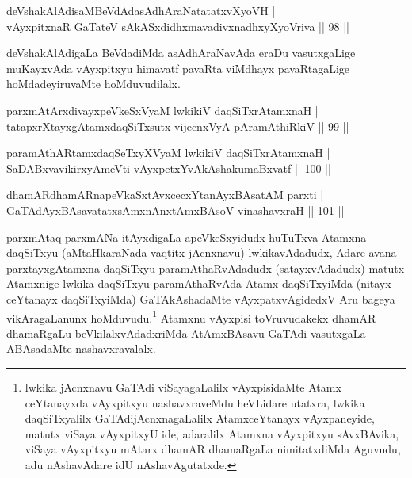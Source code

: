 
\begin{shl}
deVshakAlAdisaMBeVdAdasAdhAraNatatatxvXyoVH |\\
vAyxpitxnaR GaTateV sAkASxdidhxmavadivxnadhxyXyoVriva \hfill || 98 ||
\end{shl}

\begin{artha}
deVshakAlAdigaLa BeVdadiMda asAdhAraNavAda eraDu vasutxgaLige muKayxvAda vAyxpitxyu himavatf pavaRta viMdhayx pavaRtagaLige hoMdadeyiruvaMte hoMduvudilalx.
\end{artha}

\begin{shl}
parxmAtArxdivayxpeVkeSxVyaM lwkikiV daqSiTxrAtamxnaH |\\
tatapxrXtayxgAtamxdaqSiTxsutx vijecnxVyA pAramAthiRkiV \hfill || 99 ||
\end{shl}

\begin{shl}
paramAthARtamxdaqSeTxyXVyaM lwkikiV daqSiTxrAtamxnaH |\\
SaDABxvavikirxyAmeVti vAyxpetxYvA\s \s kAshakumaBxvatf \hfill || 100 ||
\end{shl}

\begin{shl}
dhamARdhamARnapeVkaSxtAvxcecxYtanAyxBAsatAM parxti |\\
GaTAdAyxBAsavatatxsAmxnAnx\s \s tAmxBAsoV vinashavxraH \hfill || 101 ||
\end{shl}

\begin{artha}%
parxmAtaq parxmANa itAyxdigaLa apeVkeSxyidudx huTuTxva Atamxna daqSiTxyu (aMtaHkaraNada vaqtitx jAcnxnavu) lwkikavAdadudx, Adare avana parxtayxgAtamxna daqSiTxyu paramAthaRvAdadudx (satayxvAdadudx) matutx Atamxnige lwkika daqSiTxyu paramAthaRvAda Atamx daqSiTxyiMda (nitayx ceYtanayx daqSiTxyiMda) GaTAkAshadaMte vAyxpatxvAgidedxV Aru bageya vikAragaLanunx hoMduvudu.\footnote{lwkika jAcnxnavu GaTAdi viSayagaLalilx vAyxpisidaMte Atamx ceYtanayxda vAyxpitxyu nashavxraveMdu heVLidare utatxra, lwkika daqSiTxyalilx GaTAdijAcnxnagaLalilx AtamxceYtanayx vAyxpaneyide, matutx viSaya vAyxpitxyU ide, adaralilx Atamxna vAyxpitxyu sAvxBAvika, viSaya vAyxpitxyu mAtarx dhamAR dhamaRgaLa nimitatxdiMda Aguvudu, adu nAshavAdare idU nAshavAgutatxde.} Atamxnu vAyxpisi toVruvudakekx dhamAR dhamaRgaLu beVkilalxvAdadxriMda AtAmxBAsavu GaTAdi vasutxgaLa ABAsadaMte nashavxravalalx.
\end{artha}

